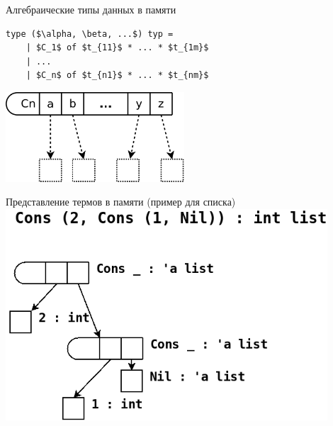 \documentclass[10pt, mathserif]{beamer}
\theoremstyle{definition}
\begin{document}

\begin{frame}[fragile]{Алгебраические типы данных в памяти}
  \centering
  \begin{lstlisting}[mathescape=true]
    type ($\alpha, \beta, ...$) typ =   
    | $C_1$ of $t_{11}$ * ... * $t_{1m}$  
    | ...
    | $C_n$ of $t_{n1}$ * ... * $t_{nm}$  
  \end{lstlisting}
  \pause
  \vspace{3em}
  \includegraphics[width=0.5\textwidth]{algebraic.png}

\end{frame}


\begin{frame}[fragile]{Представление термов в памяти (пример для списка)}
  \centering
  \includegraphics[width=0.9\textwidth]{img1.png}

\end{frame}

\end{document}
